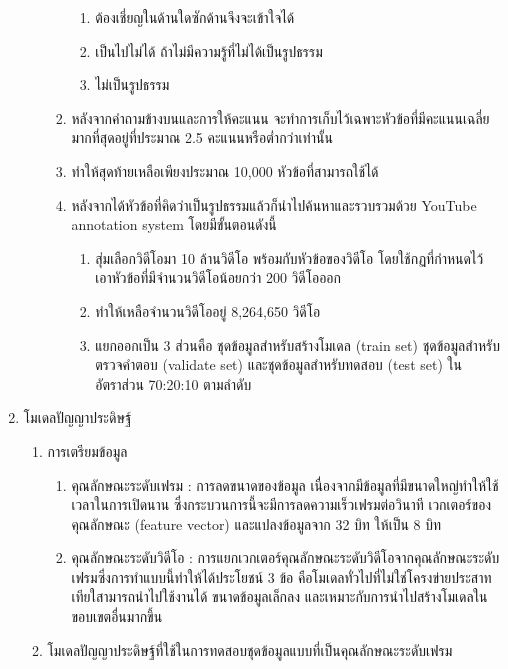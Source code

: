 \begin{enumerate}
\begin{enumerate}
\begin{enumerate}
\begin{enumerate}
				\item ต้องเชี่ยญในด้านใดซักด้านจึงจะเข้าใจได้
				\item เป็นไปไม่ได้ ถ้าไม่มีความรู้ที่ไม่ได้เป็นรูปธรรม
				\item ไม่เป็นรูปธรรม
			\end{enumerate}
			\item หลังจากคำถามข้างบนและการให้คะแนน จะทำการเก็บไว้เฉพาะหัวข้อที่มีคะแนนเฉลี่ยมากที่สุดอยู่ที่ประมาณ 2.5 คะแนนหรือต่ำกว่าเท่านั้น
			\item ทำให้สุดท้ายเหลือเพียงประมาณ 10,000 หัวข้อที่สามารถใช้ได้
			\item หลังจากได้หัวข้อที่คิดว่าเป็นรูปธรรมแล้วก็นำไปค้นหาและรวบรวมด้วย YouTube annotation system โดยมีขั้นตอนดังนี้										
			\begin{enumerate}
				\setlength\itemsep{-0.25em}
				\item สุ่มเลือกวิดีโอมา 10 ล้านวิดีโอ พร้อมกับหัวข้อของวิดีโอ โดยใช้กฏที่กำหนดไว้ เอาหัวข้อที่มีจำนวนวิดีโอน้อยกว่า 200 วิดีโอออก
				\item ทำให้เหลือจำนวนวิดีโออยู่ 8,264,650 วิดีโอ
				\item แยกออกเป็น 3 ส่วนคือ ชุดข้อมูลสำหรับสร้างโมเดล (train set) ชุดข้อมูลสำหรับตรวจคำตอบ (validate set) และชุดข้อมูลสำหรับทดสอบ (test set) ในอัตราส่วน 70:20:10 ตามลำดับ
			\end{enumerate}
		\end{enumerate}
	\end{enumerate}
	\item {โมเดลปัญญาประดิษฐ์}
	\begin{enumerate}
		\setlength\itemsep{-0.25em}
		\item การเตรียมข้อมูล
			\begin{enumerate}  
				\item คุณลักษณะระดับเฟรม : การลดขนาดของข้อมูล เนื่องจากมีข้อมูลที่มีขนาดใหญ่ทำให้ใช้เวลาในการเปิดนาน ซึ่งกระบวนการนี้จะมีการลดความเร็วเฟรมต่อวินาที 
				เวกเตอร์ของคุณลักษณะ (feature vector) และแปลงข้อมูลจาก 32 บิท ให้เป็น 8 บิท
				\item คุณลักษณะระดับวิดีโอ : การแยกเวกเตอร์คุณลักษณะระดับวิดีโอจากคุณลักษณะระดับเฟรมซึ่งการทำแบบนี้ทำให้ได้ประโยชน์ 3 ข้อ 
				คือโมเดลทั่วไปที่ไม่ใช่โครงข่ายประสาทเทียใสามารถนำไปใช้งานได้ ขนาดข้อมูลเล็กลง และเหมาะกับการนำไปสร้างโมเดลในขอบเขตอื่นมากขึ้น
			\end{enumerate}	
		\item โมเดลปัญญาประดิษฐ์ที่ใช้ในการทดสอบชุดข้อมูลแบบที่เป็นคุณลักษณะระดับเฟรม
			\begin{enumerate}

\end{enumerate}
\end{enumerate}
\end{enumerate}
